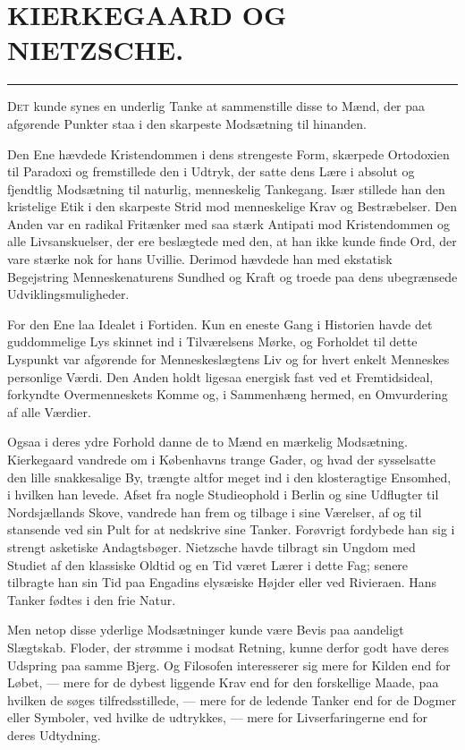 \documentclass[12pt,a4paper,openany]{book}
\newcommand{\opage}[1]{\marginnote{\footnotesize\textit{[#1]}}}
\newcommand{\essay}[2][]{\chapter*{#2}\addcontentsline{toc}{chapter}{#1}}   %
\newcommand{\streg}{\begin{center}\rule{3em}{0.4pt}\end{center}}
\begin{document}
\setcounter{footnote}{0}%
\opage{189}\essay[Kierkegaard og Nietzsche (1911)]{KIERKEGAARD OG NIETZSCHE.}
\streg

D\textsc{et} kunde synes en underlig Tanke at sammenstille disse
to Mænd, der paa afgørende Punkter staa i den skarpeste
Modsætning til hinanden.

Den Ene hævdede Kristendommen i dens strengeste Form,
skærpede Ortodoxien til Paradoxi og fremstillede den i Udtryk,
der satte dens Lære i absolut og fjendtlig Modsætning til naturlig,
menneskelig Tankegang. Især stillede han den kristelige
Etik i den skarpeste Strid mod menneskelige Krav og Bestræbelser.
Den Anden var en radikal Fritænker med saa
stærk Antipati mod Kristendommen og alle Livsanskuelser, der
ere beslægtede med den, at han ikke kunde finde Ord, der
vare stærke nok for hans Uvillie. Derimod hævdede han med
ekstatisk Begejstring Menneskenaturens Sundhed og Kraft og
troede paa dens ubegrænsede Udviklingsmuligheder.

For den Ene laa Idealet i Fortiden. Kun en eneste Gang
i Historien havde det guddommelige Lys skinnet ind i Tilværelsens
Mørke, og Forholdet til dette Lyspunkt var afgørende
for Menneskeslægtens Liv og for hvert enkelt Menneskes personlige
Værdi. Den Anden holdt ligesaa energisk fast ved et
Fremtidsideal, forkyndte Overmenneskets Komme og, i Sammenhæng
hermed, en Omvurdering af alle Værdier.

Ogsaa i deres ydre Forhold danne de to Mænd en mærkelig
Modsætning. Kierkegaard vandrede om i Københavns trange
Gader, og hvad der sysselsatte den lille snakkesalige By, trængte
altfor meget ind i den klosteragtige Ensomhed, i hvilken han
levede. Afset fra nogle Studieophold i Berlin og sine Udflugter
\setcounter{footnote}{0}%
\opage{190}til Nordsjællands Skove, vandrede han frem og tilbage i sine
Værelser, af og til stansende ved sin Pult for at nedskrive
sine Tanker. Forøvrigt fordybede han sig i strengt asketiske
Andagtsbøger. Nietzsche havde tilbragt sin Ungdom med Studiet
af den klassiske Oldtid og en Tid været Lærer i dette
Fag; senere tilbragte han sin Tid paa Engadins elysæiske Højder
eller ved Rivieraen. Hans Tanker fødtes i den frie Natur.

Men netop disse yderlige Modsætninger kunde være Bevis
paa aandeligt Slægtskab. Floder, der strømme i modsat Retning,
kunne derfor godt have deres Udspring paa samme Bjerg.
Og Filosofen interesserer sig mere for Kilden end for Løbet,
--- mere for de dybest liggende Krav end for den forskellige
Maade, paa hvilken de søges tilfredsstillede, --- mere for de
ledende Tanker end for de Dogmer eller Symboler, ved hvilke
de udtrykkes, --- mere for Livserfaringerne end for deres Udtydning.
\end{document}
